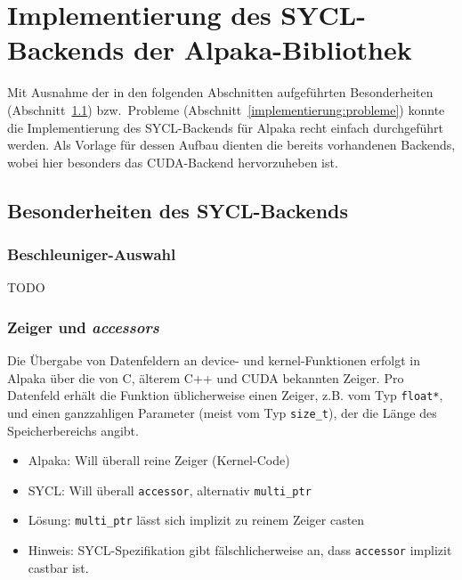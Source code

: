 \chapter{Implementierung des SYCL-Backends der Alpaka-Bibliothek}
\label{implementierung}

Mit Ausnahme der in den folgenden Abschnitten aufgeführten Besonderheiten
(Abschnitt~\ref{implementierung:besonderheiten}) bzw.\ Probleme
(Abschnitt~\ref{implementierung:probleme}) konnte die Implementierung des
SYCL-Backends für Alpaka recht einfach durchgeführt werden. Als Vorlage für
dessen Aufbau dienten die bereits vorhandenen Backends, wobei hier besonders
das CUDA-Backend hervorzuheben ist.

\section{Besonderheiten des SYCL-Backends}
\label{implementierung:besonderheiten}

\subsection{Beschleuniger-Auswahl}

TODO

\subsection{Zeiger und \textit{accessors}}
\label{implementierung:besonderheiten:zeiger}

Die Übergabe von Datenfeldern an \gls{device}- und \gls{kernel}-Funktionen
erfolgt in Alpaka über die von C, älterem C++ und CUDA bekannten Zeiger. Pro
Datenfeld erhält die Funktion üblicherweise einen Zeiger, z.B. vom Typ
\texttt{float*}, und einen ganzzahligen Parameter (meist vom Typ
\texttt{size\_t}), der die Länge des Speicherbereichs angibt.

\begin{itemize}
    \item Alpaka: Will überall reine Zeiger (Kernel-Code)
    \item SYCL: Will überall \texttt{accessor}, alternativ \texttt{multi\_ptr}
    \item Lösung: \texttt{multi\_ptr} lässt sich implizit zu reinem Zeiger casten
    \item Hinweis: SYCL-Spezifikation gibt fälschlicherweise an, dass
          \texttt{accessor} implizit castbar ist.
\end{itemize}

